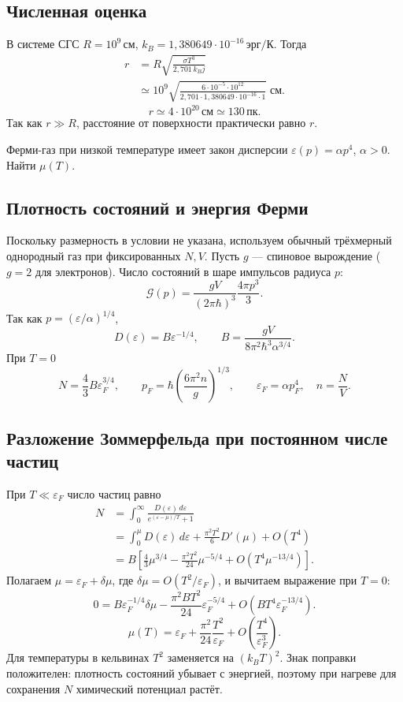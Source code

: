 \documentclass[../final.tex]{subfiles}
\begin{document}
\subsection*{Численная оценка}
В системе СГС $R=10^9\,\text{см}$,
$k_B=1{,}380649\cdot10^{-16}\,\text{эрг}/\text{К}$. Тогда
\begin{align*}
 r&=R\sqrt{\frac{\sigma T^3}{2{,}701\,k_Bj}}\\
 &\simeq10^9\sqrt{\frac{6\cdot10^{-5}\cdot10^{12}}
 {2{,}701\cdot1{,}380649\cdot10^{-16}\cdot1}}\;\text{см}.
\end{align*}
\answer
\[
 \boxed{r\simeq4\cdot10^{20}\,\text{см}\simeq130\,\text{пк}}.
\]
Так как $r\gg R$, расстояние от поверхности практически равно $r$.

\clearpage
{}
\condition
Ферми-газ при низкой температуре имеет закон дисперсии
$\varepsilon(p)=\alpha p^4$, $\alpha>0$. Найти $\mu(T)$.

\subsection*{Плотность состояний и энергия Ферми}
Поскольку размерность в условии не указана, используем обычный
трёхмерный однородный газ при фиксированных $N,V$.
Пусть $g$ --- спиновое вырождение ($g=2$ для электронов).
Число состояний в шаре импульсов радиуса $p$:
\[
 \mathcal G(p)=\frac{gV}{(2\pi\hbar)^3}\frac{4\pi p^3}{3}.
\]
Так как $p=(\varepsilon/\alpha)^{1/4}$,
\[
 D(\varepsilon)=B\varepsilon^{-1/4},\qquad
 B=\frac{gV}{8\pi^2\hbar^3\alpha^{3/4}}.
\]
При $T=0$
\[
 N=\frac43B\varepsilon_F^{3/4},\qquad
 p_F=\hbar\left(\frac{6\pi^2n}{g}\right)^{1/3},\qquad
 \varepsilon_F=\alpha p_F^4,\quad n=\frac NV.
\]

\subsection*{Разложение Зоммерфельда при постоянном числе частиц}
При $T\ll\varepsilon_F$ число частиц равно
\begin{align*}
 N&=\int_0^\infty\frac{D(\varepsilon)\,d\varepsilon}
 {e^{(\varepsilon-\mu)/T}+1}\\
 &=\int_0^\mu D(\varepsilon)\,d\varepsilon
 +\frac{\pi^2T^2}{6}D'(\mu)+O(T^4)\\
 &=B\left[\frac43\mu^{3/4}
 -\frac{\pi^2T^2}{24}\mu^{-5/4}
 +O(T^4\mu^{-13/4})\right].
\end{align*}
Полагаем $\mu=\varepsilon_F+\delta\mu$, где
$\delta\mu=O(T^2/\varepsilon_F)$, и вычитаем выражение при $T=0$:
\[
 0=B\varepsilon_F^{-1/4}\delta\mu
 -\frac{\pi^2B T^2}{24}\varepsilon_F^{-5/4}
 +O(BT^4\varepsilon_F^{-13/4}).
\]
\answer
\[
 \boxed{\mu(T)=\varepsilon_F+
 \frac{\pi^2}{24}\frac{T^2}{\varepsilon_F}
 +O\left(\frac{T^4}{\varepsilon_F^3}\right)}.
\]
Для температуры в кельвинах $T^2$ заменяется на $(k_BT)^2$.
Знак поправки положителен: плотность состояний убывает с энергией,
поэтому при нагреве для сохранения $N$ химический потенциал растёт.
\end{document}
